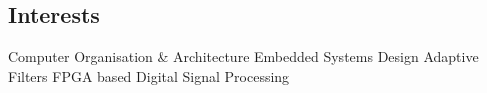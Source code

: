 \documentclass[]{deedy}
\begin{document}
\begin{minipage}[t]{0.69\textwidth}
\begin{flushleft}
%
\section{Interests}
Computer Organisation \& Architecture \textbullet{} Embedded Systems Design \textbullet{} Adaptive\\
Filters \textbullet{} FPGA based Digital Signal Processing
\sectionsep

\end{flushleft}
\end{minipage}
\end{document}
